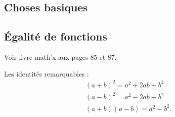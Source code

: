 


\subsection{Choses basiques}


\subsection{Égalité de fonctions}

Voir livre math'x aux pages 85 et 87.

Les identités remarquables :
\begin{subequations}
    \begin{align}
        (a+b)^2=a^2+2ab+b^2\\
        (a-b)^2=a^2-2ab+b^2\\
        (a+b)(a-b)=a^2-b^2.
    \end{align}
\end{subequations}


